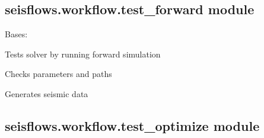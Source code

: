 \documentclass[letterpaper,10pt,english]{sphinxmanual}
\begin{document}
\subsection{seisflows.workflow.test\_forward module}
\label{\detokenize{ref/seisflows.workflow:module-seisflows.workflow.test_forward}}\label{\detokenize{ref/seisflows.workflow:seisflows-workflow-test-forward-module}}

\begin{fulllineitems}
\label{\detokenize{ref/seisflows.workflow:seisflows.workflow.test_forward.test_forward}}
Bases: {\hyperref[\detokenize{ref/seisflows.workflow:seisflows.workflow.base.base}]{}}

Tests solver by running forward simulation

\begin{fulllineitems}
\label{\detokenize{ref/seisflows.workflow:seisflows.workflow.test_forward.test_forward.check}}
Checks parameters and paths

\end{fulllineitems}


\begin{fulllineitems}
\label{\detokenize{ref/seisflows.workflow:seisflows.workflow.test_forward.test_forward.main}}
Generates seismic data

\end{fulllineitems}


\end{fulllineitems}



\subsection{seisflows.workflow.test\_optimize module}
\label{\detokenize{ref/seisflows.workflow:seisflows-workflow-test-optimize-module}}
\end{document}
